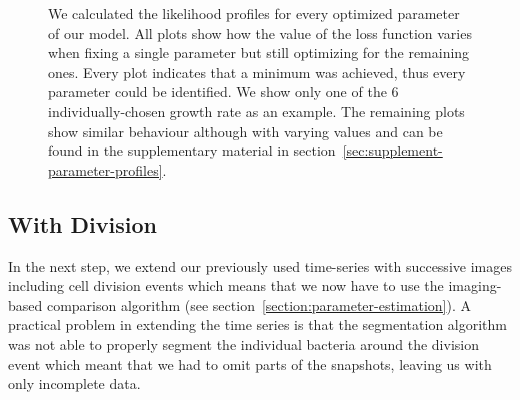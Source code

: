 \documentclass{article}
\begin{document}
\begin{figure}
\begin{tikzonimage}[width=0.25\textwidth]
    \end{tikzonimage}%
    \caption{
        We calculated the likelihood profiles for every optimized parameter of our model.
        All plots show how the value of the loss function varies when fixing a single parameter but
        still optimizing for the remaining ones.
        Every plot indicates that a minimum was achieved, thus every parameter could be identified.
        We show only one of the 6 individually-chosen growth rate as an example.
        The remaining plots show similar behaviour although with varying values and can be found in
        the supplementary material in section~\ref{sec:supplement-parameter-profiles}.
    }
    \label{fig:parameter-estimates-single-step}
\end{figure}

\subsection{With Division}

In the next step, we extend our previously used time-series with successive images including
cell division events which means that we now have to use the imaging-based comparison algorithm (see
section~\ref{section:parameter-estimation}).
A practical problem in extending the time series is that the segmentation algorithm was not able to
properly segment the individual bacteria around the division event which meant that we had to omit
parts of the snapshots, leaving us with only incomplete data.
\end{document}
